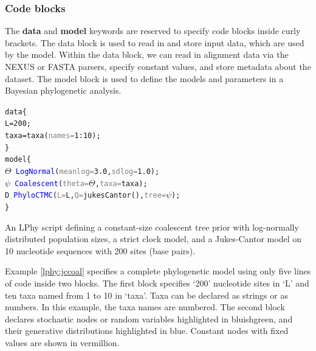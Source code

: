 \documentclass[10pt,letterpaper,table]{article}
\theoremstyle{definition}
\newtheorem{exmp}{Example}[]
\begin{document}
\subsubsection{Code blocks}
The \textbf{data} and \textbf{model} keywords are reserved to specify code blocks inside curly brackets. 
The data block is used to read in and store input data, which are used by the model. 
Within the data block, we can read in alignment data via the NEXUS or FASTA parsers, specify constant values, and store metadata about the dataset.
The model block is used to define the models and parameters in a Bayesian phylogenetic analysis. 
\begin{example}
{
  \small
    \begin{alltt}
  data \{
    L = \textcolor{constant}{200};
    taxa = \textcolor{generator}{taxa}(\textcolor{gray}{names=}\textcolor{constant}{1}:\textcolor{constant}{10});
  \}
  model \{
    \textcolor{bluishgreen}{\(\Theta\)} ~ \textcolor{blue}{LogNormal}(\textcolor{gray}{meanlog=}\textcolor{constant}{3.0}, \textcolor{gray}{sdlog=}\textcolor{constant}{1.0});
    \textcolor{bluishgreen}{\(\psi\)} ~ \textcolor{blue}{Coalescent}(\textcolor{gray}{theta=}\textcolor{bluishgreen}{\(\Theta\)}, \textcolor{gray}{taxa=}taxa);
    \textcolor{bluishgreen}{D} ~ \textcolor{blue}{PhyloCTMC}(\textcolor{gray}{L=}L, \textcolor{gray}{Q=}\textcolor{generator}{jukesCantor}(), \textcolor{gray}{tree=}\textcolor{bluishgreen}{\(\psi\)});
  \}
    \end{alltt}
    \caption{\small{An LPhy script defining a constant-size coalescent tree prior with log-normally distributed population sizes, a strict clock model, and a Jukes-Cantor model on 10 nucleotide sequences with 200 sites (base pairs).}}
    \label{lphy:jccoal}
}
\end{example}

\medskip{}

Example \ref{lphy:jccoal} specifies a complete phylogenetic model using only five lines of code inside two blocks. 
The first block specifies `200' nucleotide sites in `L' and ten taxa named from 1 to 10 in `taxa'. 
Taxa can be declared as strings or as numbers. 
In this example, the taxa names are numbered. 
The second block declares stochastic nodes or random variables highlighted in bluishgreen, and their generative distributions highlighted in blue. 
Constant nodes with fixed values are shown in vermillion.  
\end{document}
